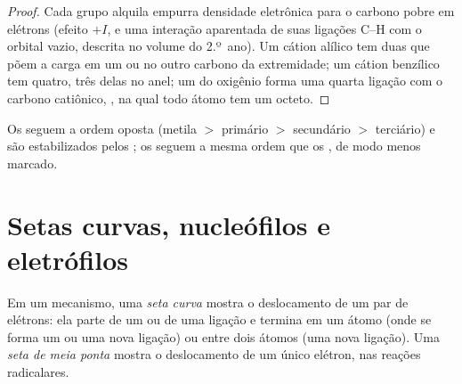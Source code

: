 \begin{proof}
Cada grupo alquila empurra densidade eletrônica para o carbono pobre em
elétrons (efeito $+I$, e uma interação aparentada de suas ligações C--H
com o orbital vazio, descrita no volume do 2.º~ano). Um cátion alílico
tem duas  que põem a carga em um ou no outro
carbono da extremidade; um cátion benzílico tem quatro, três delas no
anel; um  do oxigênio forma uma quarta ligação com o
carbono catiônico, , na qual todo átomo tem um octeto.
\end{proof}

Os  seguem a ordem oposta (metila $>$ primário $>$ secundário
$>$ terciário) e são estabilizados pelos ; os 
seguem a mesma ordem que os , de modo menos marcado.

\section{Setas curvas, nucleófilos e eletrófilos}

\begin{definition}\label{def:b1:electronic-effects:curly-arrow}
Em um mecanismo, uma \emph{seta curva} mostra o
deslocamento de um par de elétrons: ela parte de um  ou de
uma ligação e termina em um átomo (onde se forma um  ou
uma nova ligação) ou entre dois átomos (uma nova ligação). Uma
\emph{seta de meia ponta} mostra o deslocamento de
um único elétron, nas reações radicalares.
\end{definition}

